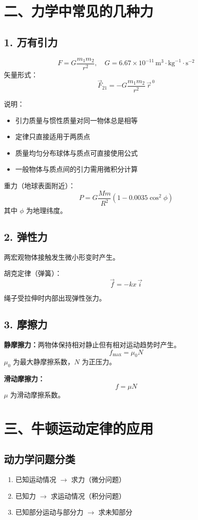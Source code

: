 \documentclass{ctexart}
\begin{document}
\section*{二、力学中常见的几种力}

\subsection*{1. 万有引力}
\[
F = G\frac{m_1 m_2}{r^{2}},\quad G = 6.67\times10^{-11}\,\text{m}^{3}\!\cdot\!\text{kg}^{-1}\!\cdot\!\text{s}^{-2}
\]
矢量形式：
\[
\vec{F}_{21} = -G\frac{m_1 m_2}{r^{2}}\,\vec{r}^{\,0}
\]

说明：
\begin{itemize}
  \item 引力质量与惯性质量对同一物体总是相等
  \item 定律只直接适用于两质点
  \item 质量均匀分布球体与质点可直接使用公式
  \item 一般物体与质点间的引力需用微积分计算
\end{itemize}

重力（地球表面附近）：
\[
P = G\frac{Mm}{R^{2}}(1 - 0.0035\cos^{2}\phi)
\]
其中 $\phi$ 为地理纬度。

\subsection*{2. 弹性力}
两宏观物体接触发生微小形变时产生。

胡克定律（弹簧）：
\[
\vec{f} = -kx\,\vec{i}
\]

绳子受拉伸时内部出现弹性张力。

\subsection*{3. 摩擦力}

\textbf{静摩擦力：}两物体保持相对静止但有相对运动趋势时产生。
\[
f_{\text{max}} = \mu_0 N
\]
$\mu_0$ 为最大静摩擦系数，$N$ 为正压力。

\textbf{滑动摩擦力：}
\[
f = \mu N
\]
$\mu$ 为滑动摩擦系数。

\section*{三、牛顿运动定律的应用}

\subsection*{动力学问题分类}
\begin{enumerate}
  \item 已知运动情况 $\to$ 求力（微分问题）
  \item 已知力 $\to$ 求运动情况（积分问题）
  \item 已知部分运动与部分力 $\to$ 求未知部分
\end{enumerate}
\end{document}
